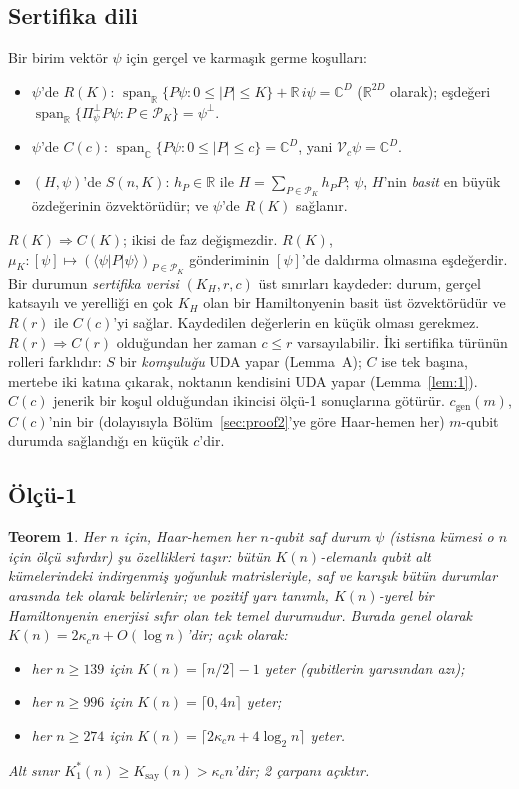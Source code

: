 \documentclass[aps,pra,onecolumn,superscriptaddress,nofootinbib,longbibliography,10pt]{revtex4-2}
\newtheorem{theorem}{Teorem}
\theoremstyle{definition}
\newcommand{\CC}{\mathbb C}
\newcommand{\RR}{\mathbb R}
\newcommand{\spanR}{\operatorname{span}_{\RR}}
\newcommand{\spanC}{\operatorname{span}_{\CC}}
\newcommand{\Pperp}{\Pi^{\perp}_{\psi}}
\newcommand{\kc}{\kappa_c}
\newcommand{\Ko}{K^{*}_{1}}
\newcommand{\Kc}{K_{\mathrm{say}}}
\newcommand{\cgen}{c_{\mathrm{gen}}}
\begin{document}
\subsection{Sertifika dili}
Bir birim vektör $\psi$ için gerçel ve karmaşık germe koşulları:
\begin{itemize}
\item $\psi$'de $R(K)$: $\spanR\{P\psi:0\le|P|\le K\}+\RR\,i\psi=\CC^D$ ($\RR^{2D}$ olarak); eşdeğeri $\spanR\{\Pperp P\psi:P\in\mathcal P_K\}=\psi^\perp$.
\item $\psi$'de $C(c)$: $\spanC\{P\psi:0\le|P|\le c\}=\CC^D$, yani $\mathcal V_c\psi=\CC^D$.
\item $(H,\psi)$'de $S(n,K)$: $h_P\in\RR$ ile $H=\sum_{P\in\mathcal P_K}h_PP$; $\psi$, $H$'nin \emph{basit} en büyük özdeğerinin özvektörüdür; ve $\psi$'de $R(K)$ sağlanır.
\end{itemize}
$R(K)\Rightarrow C(K)$; ikisi de faz değişmezdir. $R(K)$, $\mu_K:[\psi]\mapsto(\langle\psi|P|\psi\rangle)_{P\in\mathcal P_K}$ gönderiminin $[\psi]$'de daldırma olmasına eşdeğerdir. Bir durumun \emph{sertifika verisi} $(K_H,r,c)$ üst sınırları kaydeder: durum, gerçel katsayılı ve yerelliği en çok $K_H$ olan bir Hamiltonyenin basit üst özvektörüdür ve $R(r)$ ile $C(c)$'yi sağlar. Kaydedilen değerlerin en küçük olması gerekmez. $R(r)\Rightarrow C(r)$ olduğundan her zaman $c\le r$ varsayılabilir. İki sertifika türünün rolleri farklıdır: $S$ bir \emph{komşuluğu} UDA yapar (Lemma~A); $C$ ise tek başına, mertebe iki katına çıkarak, noktanın kendisini UDA yapar (Lemma~\ref{lem:1}). $C(c)$ jenerik bir koşul olduğundan ikincisi ölçü-1 sonuçlarına götürür. $\cgen(m)$, $C(c)$'nin bir (dolayısıyla Bölüm~\ref{sec:proof2}'ye göre Haar-hemen her) $m$-qubit durumda sağlandığı en küçük $c$'dir.

\subsection{Ölçü-1}
\begin{theorem}\label{thm:main}
Her $n$ için, Haar-hemen her $n$-qubit saf durum $\psi$ (istisna kümesi o $n$ için ölçü sıfırdır) şu özellikleri taşır: bütün $K(n)$-elemanlı qubit alt kümelerindeki indirgenmiş yoğunluk matrisleriyle, saf ve karışık bütün durumlar arasında tek olarak belirlenir; ve pozitif yarı tanımlı, $K(n)$-yerel bir Hamiltonyenin enerjisi sıfır olan tek temel durumudur. Burada genel olarak $K(n)=2\kc n+O(\log n)$'dir; açık olarak:
\begin{itemize}
\item her $n\ge139$ için $K(n)=\lceil n/2\rceil-1$ yeter (qubitlerin yarısından azı);
\item her $n\ge996$ için $K(n)=\lceil0{,}4n\rceil$ yeter;
\item her $n\ge274$ için $K(n)=\lceil2\kc n+4\log_2n\rceil$ yeter.
\end{itemize}
Alt sınır $\Ko(n)\ge\Kc(n)>\kc n$'dir; 2 çarpanı açıktır.
\end{theorem}
\end{document}
